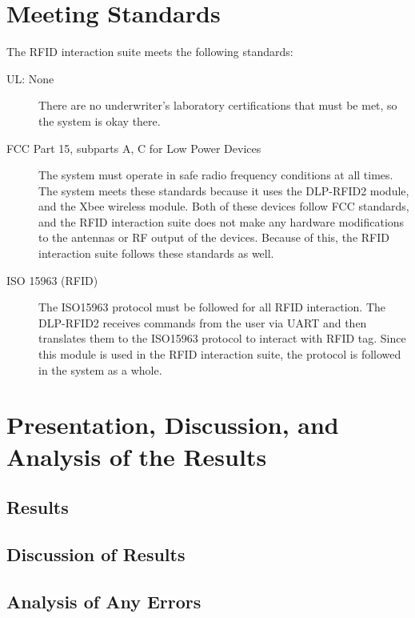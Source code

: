 \documentclass[12pt]{article} %
\begin{document}
\begin{itemize}
\begin{itemize}
\begin{itemize}
\begin{itemize}
\section{Meeting Standards}

The RFID interaction suite meets the following standards:

\begin{description}
	\item[UL: None] There are no underwriter's laboratory certifications that must be met, so the system is okay there.
	\item[FCC Part 15, subparts A, C for Low Power Devices]  The system must operate in safe radio frequency conditions at all times.  The system meets these standards because it uses the DLP-RFID2 module, and the Xbee wireless module.  Both of these devices follow FCC standards, and the RFID interaction suite does not make any hardware modifications to the antennas or RF output of the devices.  Because of this, the RFID interaction suite follows these standards as well.
	\item[ISO 15963 (RFID)] The ISO15963 protocol must be followed for all RFID interaction.  The DLP-RFID2 receives commands from the user via UART and then translates them to the ISO15963 protocol to interact with RFID tag.  Since this module is used in the RFID interaction suite, the protocol is followed in the system as a whole.
\end{description}

\section{Presentation, Discussion, and Analysis of the Results}
%
%
\subsection{Results } %

\subsection{Discussion of Results } %

\subsection{Analysis of Any Errors } %
%


\end{itemize}
\end{itemize}
\end{itemize}
\end{itemize}
\end{document}
